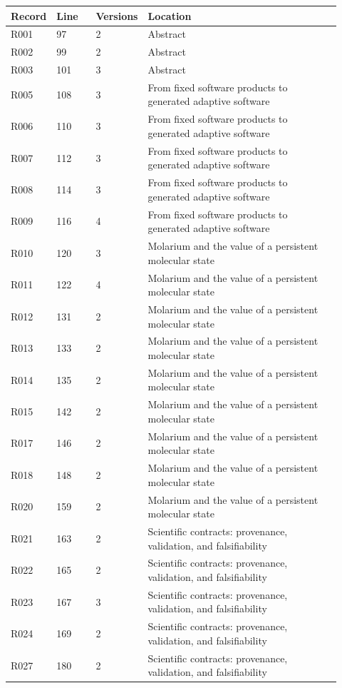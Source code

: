 \documentclass[11pt]{article}
\begin{document}
\begin{longtable}{@{}p{0.10\linewidth}p{0.12\linewidth}p{0.10\linewidth}p{0.60\linewidth}@{}}
\toprule Record & Line & Versions & Location\\\midrule\endhead
R001 & 97 & 2 & Abstract \\
R002 & 99 & 2 & Abstract \\
R003 & 101 & 3 & Abstract \\
R005 & 108 & 3 & From fixed software products to generated adaptive software \\
R006 & 110 & 3 & From fixed software products to generated adaptive software \\
R007 & 112 & 3 & From fixed software products to generated adaptive software \\
R008 & 114 & 3 & From fixed software products to generated adaptive software \\
R009 & 116 & 4 & From fixed software products to generated adaptive software \\
R010 & 120 & 3 & Molarium and the value of a persistent molecular state \\
R011 & 122 & 4 & Molarium and the value of a persistent molecular state \\
R012 & 131 & 2 & Molarium and the value of a persistent molecular state \\
R013 & 133 & 2 & Molarium and the value of a persistent molecular state \\
R014 & 135 & 2 & Molarium and the value of a persistent molecular state \\
R015 & 142 & 2 & Molarium and the value of a persistent molecular state \\
R017 & 146 & 2 & Molarium and the value of a persistent molecular state \\
R018 & 148 & 2 & Molarium and the value of a persistent molecular state \\
R020 & 159 & 2 & Molarium and the value of a persistent molecular state \\
R021 & 163 & 2 & Scientific contracts: provenance, validation, and falsifiability \\
R022 & 165 & 2 & Scientific contracts: provenance, validation, and falsifiability \\
R023 & 167 & 3 & Scientific contracts: provenance, validation, and falsifiability \\
R024 & 169 & 2 & Scientific contracts: provenance, validation, and falsifiability \\
R027 & 180 & 2 & Scientific contracts: provenance, validation, and falsifiability \\

\end{longtable}
\end{document}

